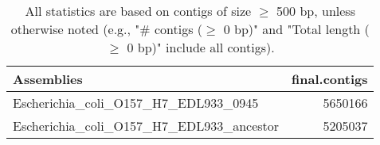 \documentclass[12pt,a4paper]{article}
\begin{document}
\begin{table}[ht]
\begin{center}
\caption{All statistics are based on contigs of size $\geq$ 500 bp, unless otherwise noted (e.g., "\# contigs ($\geq$ 0 bp)" and "Total length ($\geq$ 0 bp)" include all contigs).}
\begin{tabular}{|l*{1}{|r}|}
\hline
Assemblies & final.contigs \\ \hline
Escherichia\_coli\_O157\_H7\_EDL933\_0945 & 5650166 \\ \hline
Escherichia\_coli\_O157\_H7\_EDL933\_ancestor & 5205037 \\ \hline
\end{tabular}
\end{center}
\end{table}
\end{document}
